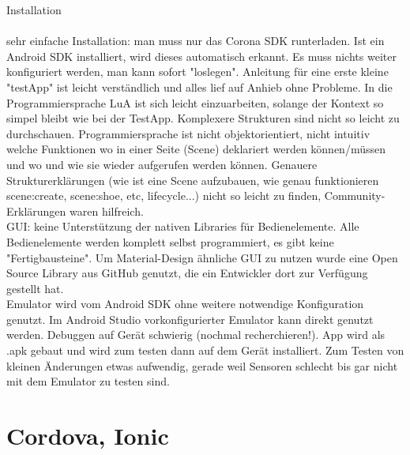 Installation
\\
\\
sehr einfache Installation: man muss nur das Corona SDK runterladen. Ist ein Android SDK installiert, wird dieses automatisch erkannt. Es muss nichts weiter konfiguriert werden, man kann sofort "loslegen". Anleitung für eine erste kleine "testApp" ist leicht verständlich und alles lief auf Anhieb ohne Probleme. In die Programmiersprache LuA ist sich leicht einzuarbeiten, solange der Kontext so simpel bleibt wie bei der TestApp. Komplexere Strukturen sind nicht so leicht zu durchschauen. Programmiersprache ist nicht objektorientiert, nicht intuitiv welche Funktionen wo in einer Seite (Scene) deklariert werden können/müssen und wo und wie sie wieder aufgerufen werden können. Genauere Strukturerklärungen (wie ist eine Scene aufzubauen, wie genau funktionieren scene:create, scene:shoe, etc, lifecycle...) nicht so leicht zu finden, Community-Erklärungen waren hilfreich.
\\
GUI: keine Unterstützung der nativen Libraries für Bedienelemente. Alle Bedienelemente werden komplett selbst programmiert, es gibt keine "Fertigbausteine". Um Material-Design ähnliche GUI zu nutzen wurde eine Open Source Library aus GitHub genutzt, die ein Entwickler dort zur Verfügung gestellt hat. 
\\
Emulator wird vom Android SDK ohne weitere notwendige Konfiguration genutzt. Im Android Studio vorkonfigurierter Emulator kann direkt genutzt werden. Debuggen auf Gerät schwierig (nochmal recherchieren!). App wird als .apk gebaut und wird zum testen dann auf dem Gerät installiert. Zum Testen von kleinen Änderungen etwas aufwendig, gerade weil Sensoren schlecht bis gar nicht mit dem Emulator zu testen sind. 

\section{Cordova, Ionic}

